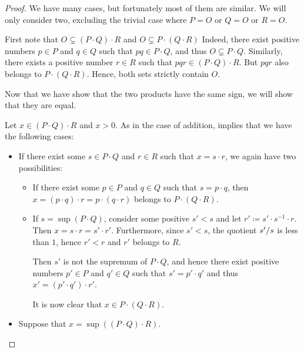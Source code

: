 \begin{proof}
   We have many cases, but fortunately most of them are similar. We will only consider two, excluding the trivial case where \( P = O \) or \( Q = O \) or \( R = O \).

   First note that \( O \subsetneq (P \cdot Q) \cdot R \) and \( O \subsetneq P \cdot (Q \cdot R) \) Indeed, there exist positive numbers \( p \in P \) and \( q \in Q \) such that \( pq \in P \cdot Q \), and thus \( O \subsetneq P \cdot Q \). Similarly, there exists a positive number \( r \in R \) such that \( pqr \in (P \cdot Q) \cdot R \). But \( pqr \) also belongs to \( P \cdot (Q \cdot R) \). Hence, both sets strictly contain \( O \).

  Now that we have show that the two products have the same sign, we will show that they are equal.

  Let \( x \in (P \cdot Q) \cdot R \) and \( x > 0 \). As in the case of addition,  implies that we have the following cases:
  \begin{itemize}
    \item If there exist some \( s \in P \cdot Q \) and \( r \in R \) such that \( x = s \cdot r \), we again have two possibilities:
    \begin{itemize}
      \item If there exist some \( p \in P \) and \( q \in Q \) such that \( s = p \cdot q \), then \( x = (p \cdot q) \cdot r = p \cdot (q \cdot r) \) belongs to \( P \cdot (Q \cdot R) \).

      \item If \( s = \sup(P \cdot Q) \), consider some positive \( s' < s \) and let \( r' \coloneqq s' \cdot s^{-1} \cdot r \). Then \( x = s \cdot r = s' \cdot r' \). Furthermore, since \( s' < s \), the quotient \( \ifrac {s'} s \) is less than \( 1 \), hence \( r' < r \) and \( r' \) belongs to \( R \).

      Then \( s' \) is not the supremum of \( P \cdot Q \), and hence there exist positive numbers \( p' \in P \) and \( q' \in Q \) such that \( s' = p' \cdot q' \) and thus \( x' = (p' \cdot q') \cdot r' \).

      It is now clear that \( x \in P \cdot (Q \cdot R) \).
    \end{itemize}

    \item Suppose that \( x = \sup((P \cdot Q) \cdot R) \).


\end{itemize}
\end{proof}

